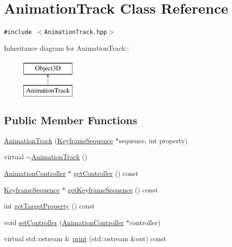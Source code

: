 \hypertarget{classm3g_1_1AnimationTrack}{
\section{AnimationTrack Class Reference}
\label{classm3g_1_1AnimationTrack}
}
{\tt \#include $<$AnimationTrack.hpp$>$}

Inheritance diagram for AnimationTrack::\begin{figure}[H]
\begin{center}
\leavevmode
\includegraphics[height=2cm]{classm3g_1_1AnimationTrack}
\end{center}
\end{figure}
\subsection*{Public Member Functions}
\begin{CompactItemize}
\item 
\hyperlink{classm3g_1_1AnimationTrack_e27012f60e982597d6e504c488e51106}{AnimationTrack} (\hyperlink{classm3g_1_1KeyframeSequence}{KeyframeSequence} $\ast$sequence, int property)
\item 
virtual \hyperlink{classm3g_1_1AnimationTrack_f7f1bc360c298d4a2f2436889159205c}{$\sim$AnimationTrack} ()
\item 
\hyperlink{classm3g_1_1AnimationController}{AnimationController} $\ast$ \hyperlink{classm3g_1_1AnimationTrack_3a54e89528127de5b4d0a48a2045a91c}{getController} () const 
\item 
\hyperlink{classm3g_1_1KeyframeSequence}{KeyframeSequence} $\ast$ \hyperlink{classm3g_1_1AnimationTrack_e83c81771a8329e1e5f978f228c0b308}{getKeyframeSequence} () const 
\item 
int \hyperlink{classm3g_1_1AnimationTrack_143de0bf90b434f1487caae5b0b66bbf}{getTargetProperty} () const 
\item 
void \hyperlink{classm3g_1_1AnimationTrack_639279dfdc74095fcb28d0c25aeec6df}{setController} (\hyperlink{classm3g_1_1AnimationController}{AnimationController} $\ast$controller)
\item 
virtual std::ostream \& \hyperlink{classm3g_1_1AnimationTrack_6fea17fa1532df3794f8cb39cb4f911f}{print} (std::ostream \&out) const 
\end{CompactItemize}
